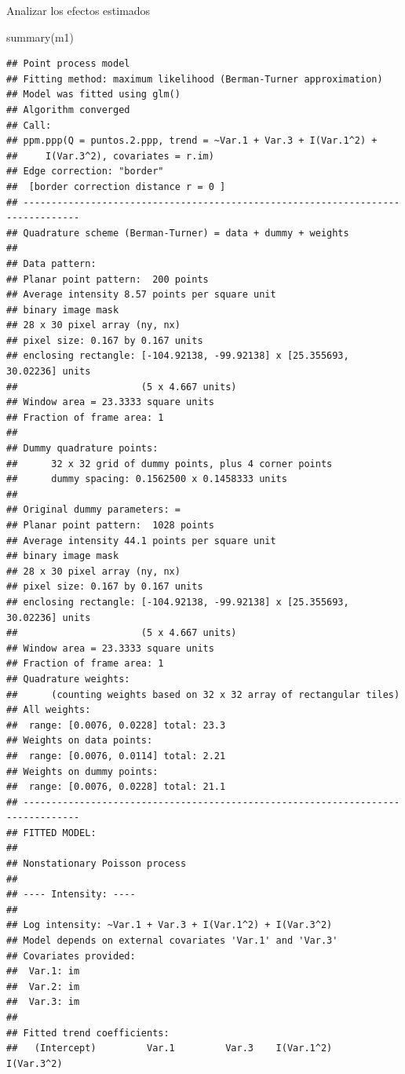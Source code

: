 \documentclass[
  11pt,
  ignorenonframetext,
]{beamer}
\newenvironment{Shaded}{}{}
\newcommand{\FunctionTok}[1]{\textcolor[rgb]{0.02,0.16,0.49}{#1}}
\newcommand{\NormalTok}[1]{#1}
\begin{document}
\begin{frame}[fragile]{Analizar los efectos estimados}
\protect\hypertarget{analizar-los-efectos-estimados}{}
\begin{Shaded}
\begin{Highlighting}[]
\FunctionTok{summary}\NormalTok{(m1)}
\end{Highlighting}
\end{Shaded}

\begin{verbatim}
## Point process model
## Fitting method: maximum likelihood (Berman-Turner approximation)
## Model was fitted using glm()
## Algorithm converged
## Call:
## ppm.ppp(Q = puntos.2.ppp, trend = ~Var.1 + Var.3 + I(Var.1^2) + 
##     I(Var.3^2), covariates = r.im)
## Edge correction: "border"
##  [border correction distance r = 0 ]
## --------------------------------------------------------------------------------
## Quadrature scheme (Berman-Turner) = data + dummy + weights
## 
## Data pattern:
## Planar point pattern:  200 points
## Average intensity 8.57 points per square unit
## binary image mask
## 28 x 30 pixel array (ny, nx)
## pixel size: 0.167 by 0.167 units
## enclosing rectangle: [-104.92138, -99.92138] x [25.355693, 30.02236] units
##                      (5 x 4.667 units)
## Window area = 23.3333 square units
## Fraction of frame area: 1
## 
## Dummy quadrature points:
##      32 x 32 grid of dummy points, plus 4 corner points
##      dummy spacing: 0.1562500 x 0.1458333 units
## 
## Original dummy parameters: =
## Planar point pattern:  1028 points
## Average intensity 44.1 points per square unit
## binary image mask
## 28 x 30 pixel array (ny, nx)
## pixel size: 0.167 by 0.167 units
## enclosing rectangle: [-104.92138, -99.92138] x [25.355693, 30.02236] units
##                      (5 x 4.667 units)
## Window area = 23.3333 square units
## Fraction of frame area: 1
## Quadrature weights:
##      (counting weights based on 32 x 32 array of rectangular tiles)
## All weights:
##  range: [0.0076, 0.0228] total: 23.3
## Weights on data points:
##  range: [0.0076, 0.0114] total: 2.21
## Weights on dummy points:
##  range: [0.0076, 0.0228] total: 21.1
## --------------------------------------------------------------------------------
## FITTED MODEL:
## 
## Nonstationary Poisson process
## 
## ---- Intensity: ----
## 
## Log intensity: ~Var.1 + Var.3 + I(Var.1^2) + I(Var.3^2)
## Model depends on external covariates 'Var.1' and 'Var.3'
## Covariates provided:
##  Var.1: im
##  Var.2: im
##  Var.3: im
## 
## Fitted trend coefficients:
##   (Intercept)         Var.1         Var.3    I(Var.1^2)    I(Var.3^2) 

\end{verbatim}
\end{frame}
\end{document}
